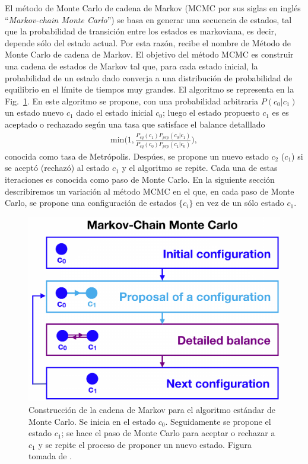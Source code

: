 \documentclass[letterpaper,superscriptaddress,aps,pra,nolongbibliography,twocolumn,showpacs,floatfix,10pt]{revtex4-2} %
\renewcommand{\>}{\rangle}
\newcommand{\<}{\langle}
\newcommand{\Fref}[1]{Fig.~\ref{#1}}
\begin{document}
El método de Monte Carlo de cadena de Markov (MCMC por sus siglas en inglés
``\textit{Markov-chain Monte Carlo}'') se basa en generar una secuencia 
de estados, tal que la probabilidad de transición entre los estados es markoviana,
es decir, depende sólo del estado actual. Por esta razón, recibe el nombre 
de Método de Monte Carlo de cadena de Markov. 
El objetivo del método MCMC es construir una cadena de estados de Markov 
tal que, para cada estado inicial, la probabilidad de un estado dado converja
a una distribución de probabilidad de equilibrio en el límite de tiempos muy 
grandes. El algoritmo se representa en la \Fref{fig:mcmc_algorithm}. En este algoritmo se propone, con una probabilidad arbitraria
$P(c_0|c_1)$ un estado nuevo $c_1$ dado el estado inicial $c_0$; luego
el estado propuesto $c_1$ es es aceptado o rechazado según una tasa 
que satisface el balance detalllado
\begin{align}
\text{min}\bigg( 1,\frac{P_{eq}(c_1)P_{prp}(c_0|c_1)}
{P_{eq}(c_0)P_{prp}(c_1|c_0)} \bigg),
\end{align}
conocida como tasa de Metrópolis. Despúes, se propone un nuevo estado 
$c_2$ ($c_1$) si se aceptó (rechazó) al estado $c_1$ y el algoritmo se repite.
Cada una de estas iteraciones es conocida como paso de Monte Carlo. 
En la siguiente sección describiremos un variación al método MCMC 
en el que, en cada paso de Monte Carlo, se propone una configuración de estados
$\{ c_i\}$ en vez de un sólo estado $c_1$.

\begin{figure}
\includegraphics[width=0.7\columnwidth]{mcmc_algorithm}
\caption{Construcción de la cadena de Markov para el algoritmo 
estándar de Monte Carlo.
Se inicia en el estado $c_0$. Seguidamente se propone el estado $c_1$;
se hace el paso de Monte Carlo para aceptar o rechazar a $c_1$ y se repite
el proceso de proponer un nuevo estado.
Figura tomada de \cite{simkovic2021manyconfiguration}.}
\label{fig:mcmc_algorithm}
\end{figure}
\end{document}
